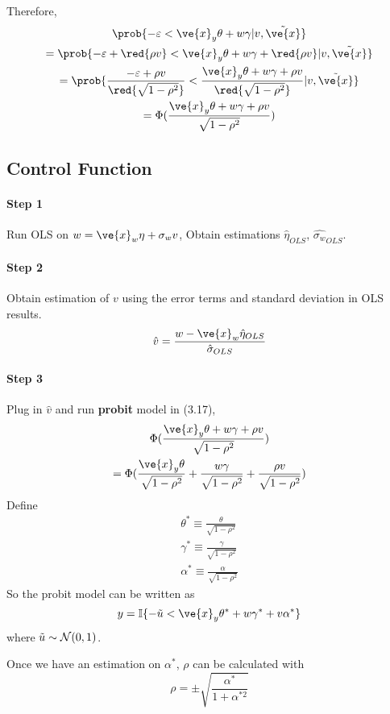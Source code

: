 \documentclass[11pt]{article}
\begin{document}
			\par Therefore,
			\begin{gather}
				\prob{-\varepsilon < \ve{x}_y \theta + w \gamma | v, \tilde{\ve{x}}} \\
				= \prob{-\varepsilon + \red{\rho v} < \ve{x}_y \theta + w \gamma + \red{\rho v}|v, \tilde{\ve{x}}} \\
				= \prob{\frac{-\varepsilon + \rho v}{\red{\sqrt{1 - \rho^2}}} < \frac{\ve{x}_y \theta + w \gamma + \rho v}{\red{\sqrt{1 - \rho^2}}} |v, \tilde{\ve{x}}} \\
				= \Phi(\frac{\ve{x}_y \theta + w \gamma + \rho v}{\sqrt{1 - \rho^2}})
			\end{gather}
			
		\subsection{Control Function}
			\paragraph{Step 1} Run OLS on $w = \ve{x}_w \eta + \sigma_w v$, Obtain estimations $\hat{\eta}_{OLS}$, $\hat{\sigma_w}_{OLS}$.
			\paragraph{Step 2} Obtain estimation of $v$ using the error terms and standard deviation in OLS results.
				\begin{equation}
					\hat{v} = \frac{w - \ve{x}_w \hat{\eta}_{OLS}}{\hat{\sigma}_{OLS}}
				\end{equation}
			\paragraph{Step 3} Plug in $\hat{v}$ and run \textbf{probit} model in (3.17),
				\begin{gather}
					\Phi(\frac{\ve{x}_y \theta + w \gamma + \rho v}{\sqrt{1 - \rho^2}}) \\
					= \Phi(\frac{\ve{x}_y \theta}{\sqrt{1 - \rho^2}} + \frac{w \gamma}{\sqrt{1 - \rho^2}} + \frac{\rho v}{\sqrt{1 - \rho^2}})
				\end{gather}
				Define
				\begin{gather}
					\theta^* \equiv \frac{\theta}{\sqrt{1 - \rho^2}} \\
					\gamma^* \equiv \frac{\gamma}{\sqrt{1 - \rho^2}} \\
					\alpha^* \equiv \frac{\alpha}{\sqrt{1 - \rho^2}}
				\end{gather}
				So the probit model can be written as
				\begin{equation}
					y = \mathbb{I}\{-\tilde{u} < \ve{x}_y \theta^* + w \gamma^* + v \alpha^*\}
				\end{equation}
				where $\tilde{u} \sim \mathcal{{N}}(0,1)$.\\
				\par Once we have an estimation on $\alpha^*$, $\rho$ can be calculated with
				\begin{equation}
					\rho = \pm \sqrt{\frac{\alpha^*}{1 + \alpha^{*2}}}
				\end{equation}
\end{document}
